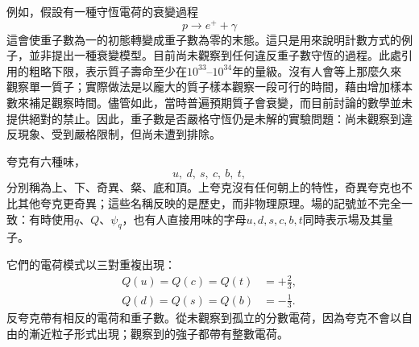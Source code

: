 \begin{classroomqa}
\end{classroomqa}

例如，假設有一種守恆電荷的衰變過程
\begin{equation}
p\longrightarrow e^++\gamma
\end{equation}
這會使重子數為一的初態轉變成重子數為零的末態。這只是用來說明計數方式的例子，並非提出一種衰變模型。目前尚未觀察到任何違反重子數守恆的過程。此處引用的粗略下限，表示質子壽命至少在\(10^{33}\)--\(10^{34}\)年的量級。沒有人會等上那麼久來觀察單一質子；實際做法是以龐大的質子樣本觀察一段可行的時間，藉由增加樣本數來補足觀察時間。儘管如此，當時普遍預期質子會衰變，而目前討論的數學並未提供絕對的禁止。因此，重子數是否嚴格守恆仍是未解的實驗問題：尚未觀察到違反現象、受到嚴格限制，但尚未遭到排除。

\begin{classroomqa}
\end{classroomqa}

夸克有六種味，
\begin{equation}
u,\ d,\ s,\ c,\ b,\ t,
\end{equation}
分別稱為上、下、奇異、粲、底和頂。上夸克沒有任何朝上的特性，奇異夸克也不比其他夸克更奇異；這些名稱反映的是歷史，而非物理原理。場的記號並不完全一致：有時使用\(q\)、\(Q\)、\(\psi_q\)，也有人直接用味的字母\(u,d,s,c,b,t\)同時表示場及其量子。

\begin{classroomqa}
\end{classroomqa}

它們的電荷模式以三對重複出現：
\begin{equation}
\begin{aligned}
Q(u)=Q(c)=Q(t)&=+\frac23,
\\
Q(d)=Q(s)=Q(b)&=-\frac13.
\end{aligned}
\end{equation}
反夸克帶有相反的電荷和重子數。從未觀察到孤立的分數電荷，因為夸克不會以自由的漸近粒子形式出現；觀察到的強子都帶有整數電荷。

